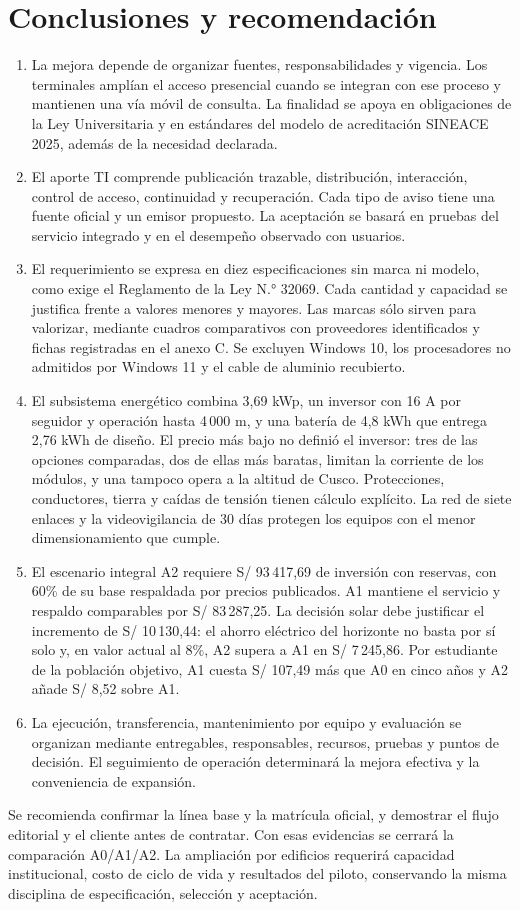 \section{Conclusiones y recomendación}
\begin{enumerate}
\item La mejora depende de organizar fuentes, responsabilidades y vigencia. Los terminales amplían el acceso presencial cuando se integran con ese proceso y mantienen una vía móvil de consulta. La finalidad se apoya en obligaciones de la Ley Universitaria y en estándares del modelo de acreditación SINEACE 2025, además de la necesidad declarada.
\item El aporte TI comprende publicación trazable, distribución, interacción, control de acceso, continuidad y recuperación. Cada tipo de aviso tiene una fuente oficial y un emisor propuesto. La aceptación se basará en pruebas del servicio integrado y en el desempeño observado con usuarios.
\item El requerimiento se expresa en diez especificaciones sin marca ni modelo, como exige el Reglamento de la Ley N.° 32069. Cada cantidad y capacidad se justifica frente a valores menores y mayores. Las marcas sólo sirven para valorizar, mediante cuadros comparativos con proveedores identificados y fichas registradas en el anexo C. Se excluyen Windows 10, los procesadores no admitidos por Windows 11 y el cable de aluminio recubierto.
\item El subsistema energético combina 3,69 kWp, un inversor con 16 A por seguidor y operación hasta 4\,000 m, y una batería de 4,8 kWh que entrega 2,76 kWh de diseño. El precio más bajo no definió el inversor: tres de las opciones comparadas, dos de ellas más baratas, limitan la corriente de los módulos, y una tampoco opera a la altitud de Cusco. Protecciones, conductores, tierra y caídas de tensión tienen cálculo explícito. La red de siete enlaces y la videovigilancia de 30 días protegen los equipos con el menor dimensionamiento que cumple.
\item El escenario integral A2 requiere S/ 93\,417,69 de inversión con reservas, con 60\% de su base respaldada por precios publicados. A1 mantiene el servicio y respaldo comparables por S/ 83\,287,25. La decisión solar debe justificar el incremento de S/ 10\,130,44: el ahorro eléctrico del horizonte no basta por sí solo y, en valor actual al 8\%, A2 supera a A1 en S/ 7\,245,86. Por estudiante de la población objetivo, A1 cuesta S/ 107,49 más que A0 en cinco años y A2 añade S/ 8,52 sobre A1.
\item La ejecución, transferencia, mantenimiento por equipo y evaluación se organizan mediante entregables, responsables, recursos, pruebas y puntos de decisión. El seguimiento de operación determinará la mejora efectiva y la conveniencia de expansión.
\end{enumerate}

Se recomienda confirmar la línea base y la matrícula oficial, y demostrar el flujo editorial y el cliente antes de contratar. Con esas evidencias se cerrará la comparación A0/A1/A2. La ampliación por edificios requerirá capacidad institucional, costo de ciclo de vida y resultados del piloto, conservando la misma disciplina de especificación, selección y aceptación.
